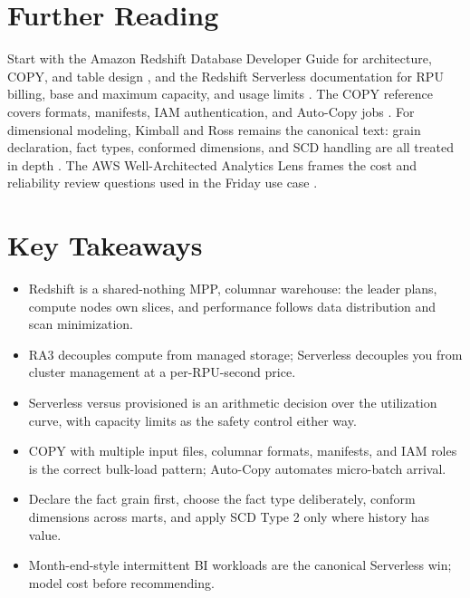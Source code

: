 \section{Further Reading}
Start with the Amazon Redshift Database Developer Guide for architecture, COPY, and table design \cite{awsRedshiftDocs}, and the Redshift Serverless documentation for RPU billing, base and maximum capacity, and usage limits \cite{awsRedshiftServerlessDocs}. The COPY reference covers formats, manifests, IAM authentication, and Auto-Copy jobs \cite{awsRedshiftCOPY}. For dimensional modeling, Kimball and Ross remains the canonical text: grain declaration, fact types, conformed dimensions, and SCD handling are all treated in depth \cite{kimballDWToolkit}. The AWS Well-Architected Analytics Lens frames the cost and reliability review questions used in the Friday use case \cite{awsWellArchitectedAnalytics}.

\section*{Key Takeaways}
\begin{itemize}
    \item Redshift is a shared-nothing MPP, columnar warehouse: the leader plans, compute nodes own slices, and performance follows data distribution and scan minimization.
    \item RA3 decouples compute from managed storage; Serverless decouples you from cluster management at a per-RPU-second price.
    \item Serverless versus provisioned is an arithmetic decision over the utilization curve, with capacity limits as the safety control either way.
    \item COPY with multiple input files, columnar formats, manifests, and IAM roles is the correct bulk-load pattern; Auto-Copy automates micro-batch arrival.
    \item Declare the fact grain first, choose the fact type deliberately, conform dimensions across marts, and apply SCD Type 2 only where history has value.
    \item Month-end-style intermittent BI workloads are the canonical Serverless win; model cost before recommending.
\end{itemize}

